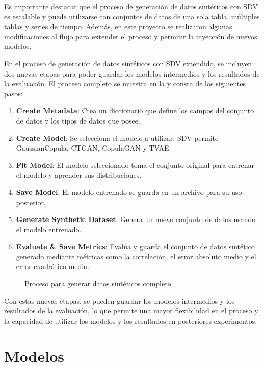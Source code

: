 Es importante destacar que el proceso de generación de datos sintéticos con SDV es escalable y puede utilizarse con conjuntos de datos de una sola tabla, múltiples tablas y series de tiempo. Además, en este proyecto se realizaron algunas modificaciones al flujo para extender el proceso y permitir la inyección de nuevos modelos.
    
\newpage
En el proceso de generación de datos sintéticos con SDV extendido, se incluyen dos nuevas etapas para poder guardar los modelos intermedios y los resultados de la evaluación. El proceso completo se muestra en la  y consta de los siguientes pasos:

\begin{enumerate}
    \item \textbf{Create Metadata}: Crea un diccionario que define los campos del conjunto de datos y los tipos de datos que posee.
    \item \textbf{Create Model}: Se selecciona el modelo a utilizar. SDV permite GaussianCopula, CTGAN, CopulaGAN y TVAE.
    \item \textbf{Fit Model}: El modelo seleccionado toma el conjunto original para entrenar el modelo y aprender sus distribuciones.
    \item \textbf{Save Model}: El modelo entrenado se guarda en un archivo para su uso posterior.
    \item \textbf{Generate Synthetic Dataset}: Genera un nuevo conjunto de datos usando el modelo entrenado.
    \item \textbf{Evaluate \& Save Metrics}: Evalúa y guarda el conjunto de datos sintético generado mediante métricas como la correlación, el error absoluto medio y el error cuadrático medio.
\end{enumerate}


\begin{figure}[H]
	\centering
	
	\caption{Proceso para generar datos sintéticos completo}
	\label{process-sdv-2}
\end{figure}

Con estas nuevas etapas, se pueden guardar los modelos intermedios y los resultados de la evaluación, lo que permite una mayor flexibilidad en el proceso y la capacidad de utilizar los modelos y los resultados en posteriores experimentos.



\section{Modelos}

